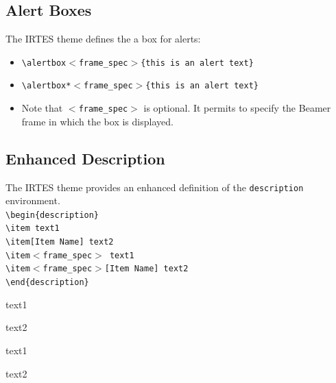 \documentclass[english,circlenumberstyle]{irtesbeamer}
\begin{document}
\subsection{Alert Boxes}
\begin{frame}{\subsecname}
	The IRTES theme defines the a box for alerts: \\
	\begin{itemize}
	\item \texttt{{\textbackslash}alertbox\ensuremath{<}frame\_spec\ensuremath{>}\{this is an alert text\}} \\[.5cm]
		\vspace{1cm}
	\item \texttt{{\textbackslash}alertbox*\ensuremath{<}frame\_spec\ensuremath{>}\{this is an alert text\}} \\[.5cm]
	\item Note that \texttt{\ensuremath{<}frame\_spec\ensuremath{>}} is optional. It permits to specify the Beamer frame in which the box is displayed.
	\end{itemize}
\end{frame}

\subsection{Enhanced Description}
\begin{frame}{\subsecname}
	The IRTES theme provides an enhanced definition of the \texttt{description} environment. \\[.5cm]
	{\smaller
	\texttt{{\textbackslash}begin\{description\}} \\
	\texttt{{\textbackslash}item text1} \\
	\texttt{{\textbackslash}item[Item Name] text2} \\
	\texttt{{\textbackslash}item$<$frame\_spec$>$ text1} \\
	\texttt{{\textbackslash}item$<$frame\_spec$>$[Item Name] text2} \\
	\texttt{{\textbackslash}end\{description\}}} \\[.5cm]
	\begin{description}
	\item text1
	\item[Item Name] text2
	\item<2> text1
	\item<2>[Item Name] text2
	\end{description}
\end{frame}
\end{document}
